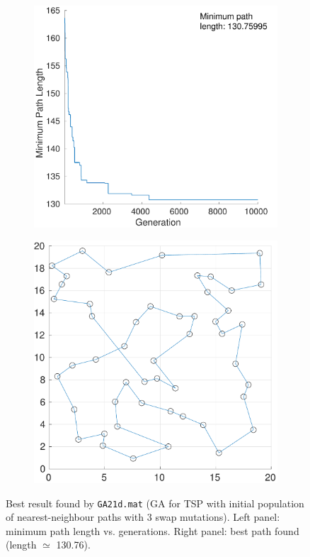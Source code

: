 \documentclass[12pt,titlepage]{article}
\begin{document}
\begin{figure}[htbp]
\centering
\begin{subfigure}{0.475\textwidth}
	\includegraphics[width=\textwidth]{Figures/2d_minpathLength}
	\caption{}
	\label{subfig:2d_minPathLength}
\end{subfigure} %
\hfill %
\begin{subfigure}{0.475\textwidth}
	\includegraphics[width=\textwidth]{Figures/2d_pathPlot}
	\caption{}
	\label{subfig:2d_pathPlot}
\end{subfigure} %
\caption{\footnotesize Best result found by \texttt{GA21d.mat} (GA for TSP with initial population of nearest-neighbour paths with 3 swap mutations). Left panel: minimum path length vs. generations. Right panel: best path found (length $\simeq$ 130.76).}
\label{fig:1d}
\end{figure}
\end{document}
